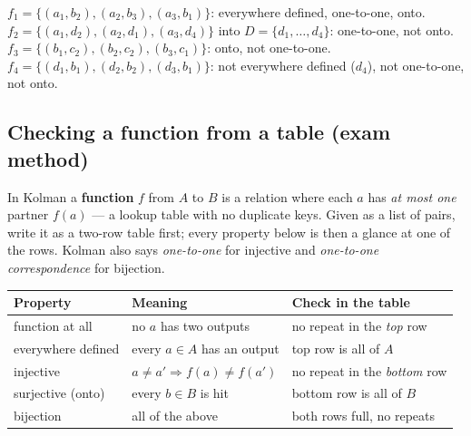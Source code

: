 \documentclass{fkt-notes}
\theoremstyle{definition}
\begin{document}
\begin{example}[5.1 Ex.~12]
  $f_1=\{(a_1,b_2),(a_2,b_3),(a_3,b_1)\}$: everywhere defined, one-to-one,
  onto.
  $f_2=\{(a_1,d_2),(a_2,d_1),(a_3,d_4)\}$ into $D=\{d_1,\dots,d_4\}$:
  one-to-one, not onto.
  $f_3=\{(b_1,c_2),(b_2,c_2),(b_3,c_1)\}$: onto, not one-to-one.
  $f_4=\{(d_1,b_1),(d_2,b_2),(d_3,b_1)\}$: not everywhere defined ($d_4$),
  not one-to-one, not onto.
\end{example}

\subsection{Checking a function from a table (exam method)}
%
In Kolman a \textbf{function} $f$ from $A$ to $B$ is a relation where each
$a$ has \emph{at most one} partner $f(a)$ --- a lookup table with no
duplicate keys. Given as a list of pairs, write it as a two-row table
first; every property below is then a glance at one of the rows.
Kolman also says \emph{one-to-one} for injective and
\emph{one-to-one correspondence} for bijection.

\begin{rulepar}
  \begin{center}
    \renewcommand{\arraystretch}{1.3}
    \begin{tabular}{@{}lll@{}}
      \toprule
      Property           & Meaning                               & Check in the table                 \\
      \midrule
      function at all    & no $a$ has two outputs                & no repeat in the \emph{top} row    \\
      everywhere defined & every $a \in A$ has an output         & top row is all of $A$              \\
      injective          & $a \ne a' \Rightarrow f(a) \ne f(a')$ & no repeat in the \emph{bottom} row \\
      surjective (onto)  & every $b \in B$ is hit                & bottom row is all of $B$           \\
      bijection          & all of the above                      & both rows full, no repeats         \\
      \bottomrule
    \end{tabular}
  \end{center}
\end{rulepar}
\end{document}
